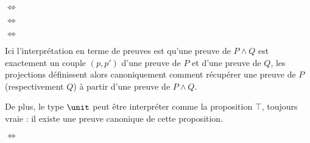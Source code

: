 \begin{center}
    \begin{prooftree}
    \end{prooftree}
    \quad $\iff$ \quad
    \begin{prooftree}
    \end{prooftree}

    \vspace{0.5cm}

    \begin{prooftree}
    \end{prooftree}
    \quad $\iff$ \quad
    \begin{prooftree}
    \end{prooftree}

    \vspace{0.5cm}

    \begin{prooftree}
    \end{prooftree}
    \quad $\iff$ \quad
    \begin{prooftree}
    \end{prooftree}
\end{center}

Ici l'interprétation en terme de preuves est qu'une preuve de $P\land Q$ est exactement un couple $(p,p')$ d'une preuve de $P$ et d'une preuve de $Q$, les projections définissent alors canoniquement comment récupérer une preuve de $P$ (respectivement $Q$) à partir d'une preuve de $P\land Q$.

De plus, le type $\unit$ peut être interpréter comme la proposition $\top$, toujours vraie : il existe une preuve canonique de cette proposition.

\begin{center}
    \begin{prooftree}
    \end{prooftree}
    \quad $\iff$ \quad
    \begin{prooftree}
    \end{prooftree}
\end{center}

